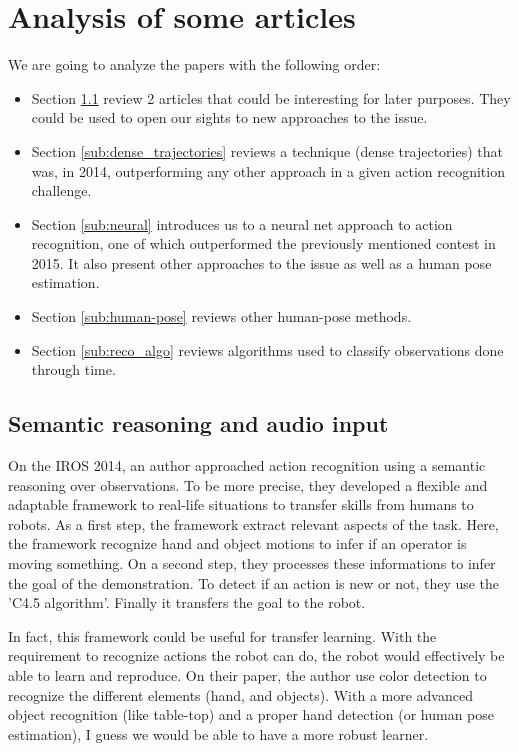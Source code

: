 \documentclass[a4paper]{article}
\begin{document}
	\section{Analysis of some articles}

		We are going to analyze the papers with the following order:
		\begin{itemize}
			\item Section \ref{sub:semantic} review 2 articles that could be interesting for later purposes. They could be used to open our sights to new approaches to the issue.
			\item Section \ref{sub:dense_trajectories} reviews a technique (dense trajectories) that was, in 2014, outperforming any other approach in a given action recognition challenge.
			\item Section \ref{sub:neural} introduces us to a neural net approach to action recognition, one of which outperformed the previously mentioned contest in 2015. It also present other approaches to the issue as well as a human pose estimation.
			\item Section \ref{sub:human-pose} reviews other human-pose methods.
			\item Section \ref{sub:reco_algo} reviews algorithms used to classify observations done through time.
		\end{itemize}

		\subsection{Semantic reasoning and audio input}
		\label{sub:semantic}
			On the IROS 2014, an author\cite{ramirez2014automatic} approached action recognition using a semantic reasoning over observations. To be more precise, they developed a flexible and adaptable framework to real-life situations to transfer skills from humans to robots. 
			As a first step, the framework extract relevant aspects of the task. Here, the framework recognize hand and object motions to infer if an operator is moving something. On a second step, they processes these informations to infer the goal of the demonstration. To detect if an action is new or not, they use the 'C4.5 algorithm'. Finally it transfers the goal to the robot. 

			\begin{mdframed}[backgroundcolor = gray!30]
				In fact, this framework could be useful for transfer learning. With the requirement to recognize actions the robot can do, the robot would effectively be able to learn and reproduce. On their paper, the author use color detection to recognize the different elements (hand, and objects). With a more advanced object recognition (like table-top) and a proper hand detection (or human pose estimation\cite{tompson2014joint}), I guess we would be able to have a more robust learner.
			\end{mdframed}
\end{document}
